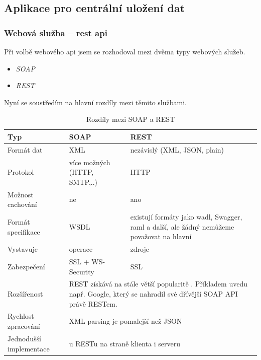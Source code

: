 \documentclass[thesis=B,czech]{FITthesis}[2012/06/26]
\begin{document}
\subsection{Aplikace pro centrální uložení dat}
  
\subsubsection{Webová služba -- \acrshort{rest} \acrshort{api}}

Při volbě webového \acrshort{api} jsem se rozhodoval mezi dvěma typy webových služeb.
\newline
\begin{itemize}[nosep]
	\item \textit{SOAP}
	\item \textit{REST}
\end{itemize}
\vspace*{1\baselineskip}

Nyní se soustředím na hlavní rozdíly mezi těmito službami.
\newline
\begin{table}[h!]\centering
\caption{Rozdíly mezi SOAP a REST}\label{tab:ws_compare}
\begin{tabular}{|p{3cm}|p{3cm}|p{5.5cm}|}\hline
Typ		& SOAP		& REST \tabularnewline \hline \hline
Formát dat\cite{ws_compare_swati}		& XML		& nezávislý (XML, JSON, plain) \tabularnewline \hline
Protokol\cite{ws_compare_swati}		& více možných (HTTP, SMTP,..)		& HTTP \tabularnewline \hline
Možnost cachování\cite{ws_compare_swati}		& ne		& ano \tabularnewline \hline	
Formát specifikace\cite{ws_compare_table}\cite{ws_compare_soapui} & WSDL\cite{ws_soap_wsdl}	& existují formáty jako \acrshort{wadl}\cite{ws_wadl}, Swagger\cite{ws_swagger}, \acrshort{raml}\cite{ws_raml} a další, ale žádný nemůžeme považovat na hlavní \cite{ws_comparison} \tabularnewline \hline 		 
Vystavuje\cite{ws_compare_steve}		& operace & zdroje \tabularnewline \hline
Zabezpečení\cite{ws_compare_steve}		& SSL + WS-Security & SSL \tabularnewline \hline  
Rozšířenost\cite{ws_compare_steve}		& \multicolumn{2}{p{8.5cm}|}{REST získává na stále větší popularitě . Příkladem uvedu např. Google, který se nahradil své dřívější SOAP API právě RESTem.}  \tabularnewline \hline 
Rychlost zpracování\cite{ws_compare_armel} 	& \multicolumn{2}{p{8.5cm}|}{XML parsing je pomalejší než JSON\cite{ws_compare_xml_json_process}}  \tabularnewline \hline 	 		  		
Jednodušší implementace\cite{ws_compare_swati}		&\multicolumn{2}{p{8.5cm}|}{u RESTu na straně klienta i serveru} \tabularnewline \hline 	 				
\end{tabular}
\end{table}
\end{document}
